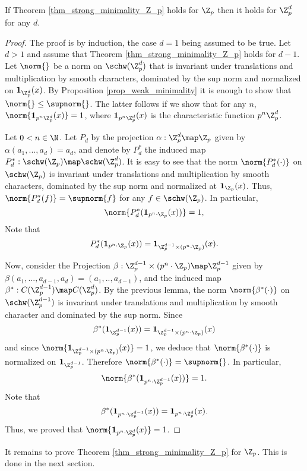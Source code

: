 \begin{prop}
If Theorem \ref{thm_strong_minimality_Z_p} holds for $\Z_p$ then it holds for $\Z_p^d$ for any $d$.
\end{prop} 
    \begin{proof}
    The proof is by induction, the case $d=1$ being assumed to be true.
    Let $d>1$ and assume that Theorem \ref{thm_strong_minimality_Z_p} holds for $d-1$.
    Let $\norm{}$ be a norm on $\schw(\Z_p^d)$ that is invariant under translations and multiplication by smooth characters, dominated by the sup norm and normalized on $\textbf{1}_{\Z_p^d}(x)$.
    By Proposition \ref{prop_weak_minimality} it is enough to show that $\norm{}\leq \supnorm{}$.
    The latter follows if we show that for any $n$, $\norm{\textbf{1}_{p^n\Z_p^d}(x)}=1$, where $\textbf{1}_{p^n\Z_p^d}(x)$ is the characteristic function $p^n\Z_p^d$.
    
    Let $0<n\in \N$.
    Let $P_d$ by the projection $\alpha:\Z_p^d\map \Z_p$ given by $\alpha(a_1,...,a_d)=a_d$, and denote by $P_d^*$ the induced map $P_d^*:\schw(\Z_p)\map \schw(\Z_p^d)$.
    It is easy to see that the norm $\norm{P_d^*(\cdot)}$ on $\schw(\Z_p)$ is invariant under translations and multiplication by smooth characters, dominated by the sup norm and normalized at $\textbf{1}_{\Z_p}(x)$.
    Thus, $\norm{P_d^*(f)}=\supnorm{f}$ for any $f\in \schw(\Z_p)$.
    In particular,
    \[\norm{P_d^*(\textbf{1}_{p^n\cdot\Z_p}(x))}=1,\]
    Note that
    \[P_d^*(\textbf{1}_{p^n\cdot\Z_p}(x))=\textbf{1}_{\Z_p^{d-1}\times (p^n\cdot\Z_p)}(x).\]
    
    Now, consider the Projection $\beta:\Z_p^{d-1}\times (p^n\cdot \Z_p)\map\Z_p^{d-1}$ given by $\beta(a_1,...,a_{d-1},a_d)=(a_1,..,a_{d-1})$, and the induced map $\beta^*:C(\Z_p^{d-1})\map C(\Z_p^d)$.
    By the previous lemma, the norm $\norm{\beta^*(\cdot)}$ on $\schw(\Z_p^{d-1})$ is invariant under translations and multiplication by smooth character and dominated by the sup norm.
    Since 
    \[\beta^*(\textbf{1}_{\Z_p^{d-1}}(x))=\textbf{1}_{\Z_p^{d-1}\times(p^n\cdot \Z_p)}(x)\]
    and since $\norm{\textbf{1}_{\Z_p^{d-1}\times(p^n\cdot \Z_p)}(x)}=1$, we deduce that $\norm{\beta^*(\cdot)}$ is normalized on $\textbf{1}_{\Z_p^{d-1}}$.
    Therefore $\norm{\beta^*(\cdot)}=\supnorm{}$.
    In particular,
    \[\norm{\beta^*(\textbf{1}_{p^n\cdot \Z_p^{d-1}}(x))}=1.\]
    Note that 
    \[\beta^*(\textbf{1}_{p^n\cdot \Z_p^{d-1}}(x))=\textbf{1}_{p^n\cdot \Z_p^d}(x).\]
    Thus, we proved that $\norm{\textbf{1}_{p^n\cdot \Z_p^d}(x)}=1$.
    \end{proof} 

It remains to prove Theorem \ref{thm_strong_minimality_Z_p} for $\Z_p$.
This is done in the next section.



